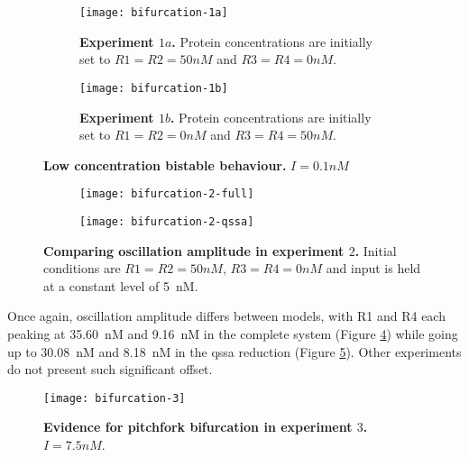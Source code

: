     \begin{figure}[!htb]
      \centering
      \begin{subfigure}[t]{0.4\textwidth}
        \centering
        \texttt{[image: bifurcation-1a]}
        \caption{\textbf{Experiment $1a$.} Protein concentrations are initially set to $R1 = R2 = 50nM$ and $R3 = R4 = 0nM$.}
        \label{fig.bifurcation-1a}
      \end{subfigure}
      \hspace{1em}
      \begin{subfigure}[t]{0.4\textwidth}
        \centering
        \texttt{[image: bifurcation-1b]}
        \caption{\textbf{Experiment $1b$.} Protein concentrations are initially set to $R1 = R2 = 0nM$ and $R3 = R4 = 50nM$.}
        \label{fig.bifurcation-1b}
      \end{subfigure}
      \caption{\textbf{Low concentration bistable behaviour.} $I = 0.1 nM$}
      \label{fig.bifurcation-1}
    \end{figure}

    \begin{figure}[!htb]
      \centering
      \begin{subfigure}[t]{0.45\textwidth}
        \centering
        \texttt{[image: bifurcation-2-full]}
        \caption{}
        \label{fig.bifurcation-2-full}
      \end{subfigure}
      \hspace{1em}
      \begin{subfigure}[t]{0.45\textwidth}
        \centering
        \texttt{[image: bifurcation-2-qssa]}
        \caption{}
        \label{fig.bifurcation-2-qssa}
      \end{subfigure}
      \caption{\textbf{Comparing oscillation amplitude in experiment $2$.} Initial conditions are $R1 = R2 = 50nM$, $R3 = R4 = 0nM$ and input is held at a constant level of \SI{5}{\nano M}.}
      \label{fig.bifurcation-2}
    \end{figure}

    Once again, oscillation amplitude differs between models, with R1 and R4 each peaking at \SI{35.60}{\nano M} and \SI{9.16}{\nano M} in the complete system (Figure \ref{fig.bifurcation-2-full}) while going up to \SI{30.08}{\nano M} and \SI{8.18}{\nano M} in the \ac{qssa} reduction (Figure \ref{fig.bifurcation-2-qssa}).
    Other experiments do not present such significant offset.

    \begin{figure}[!htb]
      \centering
      \texttt{[image: bifurcation-3]}
      \caption{\textbf{Evidence for pitchfork bifurcation in experiment $3$.} $I = 7.5nM$.}
      \label{fig.bifurcation-3}
    \end{figure}

